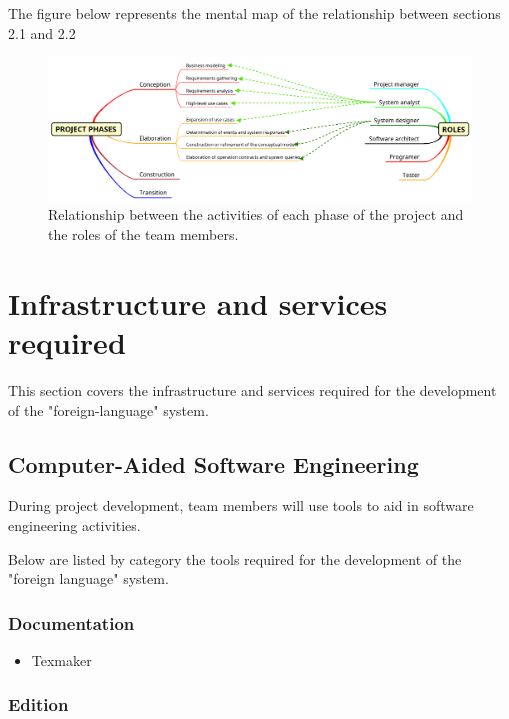 \documentclass[11pt, twoside, a4paper]{book}
\begin{document}
              
			\begin{landscape}
				The figure below represents the mental map of the relationship between sections 2.1 and 2.2  
				\begin{figure}[!htb] 
					\center
   					\includegraphics[scale=0.4,bb = 0 0 1545 525]{mindmap-phases_and_roles.png}
					\caption{Relationship between the activities of each phase of the project and the roles of the team members.}
				\end{figure}
			\end{landscape}		
        		
			\section{Infrastructure and services required}
				
				This section covers the infrastructure and services required for the development of the "foreign-language" system.
				
				\subsection{Computer-Aided Software Engineering}
					
					During project development, team members will use tools to aid in software engineering activities.
					
					Below are listed by category the tools required for the development of the "foreign language" system.

					\subsubsection{Documentation}
					
						\begin{itemize}
							\item Texmaker
						\end{itemize}
	
					\subsubsection{Edition}
						
\end{document}
